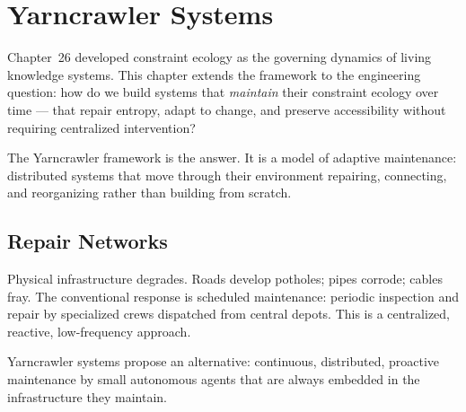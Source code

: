 
\chapter{Yarncrawler Systems}



Chapter~26 developed constraint ecology as the governing dynamics of
living knowledge systems. This chapter extends the framework to the
engineering question: how do we build systems that \emph{maintain}
their constraint ecology over time — that repair entropy, adapt to
change, and preserve accessibility without requiring centralized
intervention?

The Yarncrawler framework is the answer. It is a model of adaptive
maintenance: distributed systems that move through their environment
repairing, connecting, and reorganizing rather than building from scratch.

\section{Repair Networks}

Physical infrastructure degrades. Roads develop potholes; pipes corrode;
cables fray. The conventional response is scheduled maintenance:
periodic inspection and repair by specialized crews dispatched from
central depots. This is a centralized, reactive, low-frequency approach.

Yarncrawler systems propose an alternative: continuous, distributed,
proactive maintenance by small autonomous agents that are always
embedded in the infrastructure they maintain.

